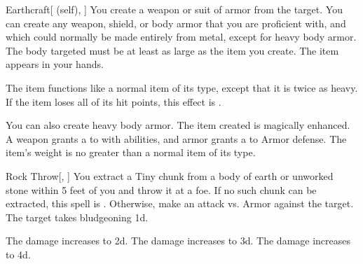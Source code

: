 \lowercase{\hypertarget{spell:Earthcraft}{}}\label{spell:Earthcraft}
\begin{attuneability}[Rank 1]{\hypertarget{spell:Earthcraft}{Earthcraft}}[ (self), ]
You create a weapon or suit of armor from the target.
You can create any weapon, shield, or body armor that you are proficient with, and which could normally be made entirely from metal, except for heavy body armor.
The body targeted must be at least as large as the item you create.
The item appears in your hands.

The item functions like a normal item of its type, except that it is twice as heavy.
If the item loses all of its hit points, this effect is .

\rankline
{} You can also create heavy body armor.
 The item created is magically enhanced.
A weapon grants a   to  with  abilities,
and armor grants a   to Armor defense.
 The item's weight is no greater than a normal item of its type.
\end{attuneability}
\vspace{0.25em}



\lowercase{\hypertarget{spell:Rock Throw}{}}\label{spell:Rock Throw}
\begin{freeability}[Rank 1]{\hypertarget{spell:Rock Throw}{Rock Throw}}[, ]
You extract a Tiny chunk from a body of earth or unworked stone within 5 feet of you and throw it at a foe.
If no such chunk can be extracted, this spell is .
Otherwise, make an attack vs. Armor against the target.
\hit The target takes bludgeoning  \plus1d.

\rankline
{} The damage increases to  \plus2d.
 The damage increases to  \plus3d.
 The damage increases to  \plus4d.
\end{freeability}
\vspace{0.25em}



